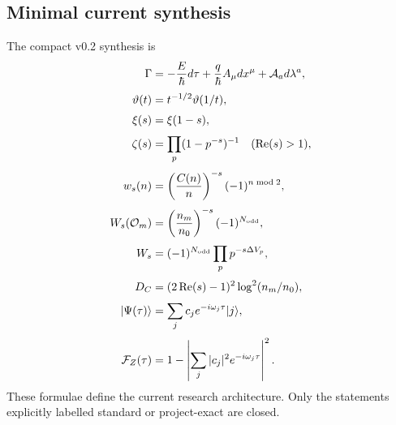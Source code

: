 \subsection{Minimal current synthesis}

The compact v0.2 synthesis is
\begin{align}
\Gamma
&=-\frac{E}{\hbar}d\tau+\frac{q}{\hbar}A_\mu dx^\mu+\mathcal A_a d\lambda^a,\\[1mm]
\vartheta(t)&=t^{-1/2}\vartheta(1/t),\\[1mm]
\xi(s)&=\xi(1-s),\\[1mm]
\zeta(s)&=\prod_p(1-p^{-s})^{-1}\quad(\operatorname{Re}(s)>1),\\[1mm]
w_s(n)&=\left(\frac{C(n)}n\right)^{-s}(-1)^{n\bmod2},\\[1mm]
W_s(\mathcal O_m)&=\left(\frac{n_m}{n_0}\right)^{-s}(-1)^{N_{\rm odd}},\\[1mm]
W_s&=(-1)^{N_{\rm odd}}\prod_p p^{-s\Delta V_p},\\[1mm]
D_C&=(2\operatorname{Re}(s)-1)^2\log^2(n_m/n_0),\\[1mm]
|\Psi(\tau)\rangle&=\sum_jc_j e^{-i\omega_j\tau}|j\rangle,\\[1mm]
\mathcal F_Z(\tau)&=1-\left|\sum_j|c_j|^2e^{-i\omega_j\tau}\right|^2.
\end{align}
These formulae define the current research architecture. Only the statements explicitly labelled standard or project-exact are closed.
